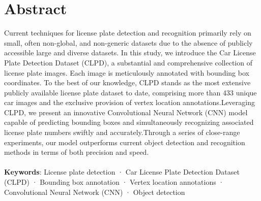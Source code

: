 %
%


\chapter{Abstract}

Current techniques for license plate detection and recognition primarily rely on small, often non-global, and non-generic datasets due to the absence of publicly accessible large  and diverse datasets. In this study, we introduce the Car License Plate Detection Dataset (CLPD), a substantial and comprehensive collection of license plate images. Each image is meticulously annotated with bounding box coordinates. To the best of our knowledge, CLPD stands as the most extensive publicly available license plate dataset to date, comprising more than 433 unique car images and the exclusive provision of vertex location annotations.Leveraging CLPD, we present an innovative Convolutional Neural Network (CNN) model capable of predicting bounding boxes and simultaneously recognizing associated license plate numbers swiftly and accurately.Through a series of close-range experiments, our model outperforms current object detection and recognition methods in terms of both precision and speed.\\\\
\textbf{Keywords}: License plate detection · Car License Plate Detection Dataset (CLPD) · Bounding box annotation · Vertex location annotations · Convolutional Neural Network (CNN) · Object detection 



